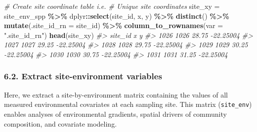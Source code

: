 \documentclass[
]{article}
\newenvironment{Shaded}{\begin{snugshade}}{\end{snugshade}}
\newcommand{\AttributeTok}[1]{\textcolor[rgb]{0.13,0.29,0.53}{#1}}
\newcommand{\CommentTok}[1]{\textcolor[rgb]{0.56,0.35,0.01}{\textit{#1}}}
\newcommand{\FunctionTok}[1]{\textcolor[rgb]{0.13,0.29,0.53}{\textbf{#1}}}
\newcommand{\NormalTok}[1]{#1}
\newcommand{\OtherTok}[1]{\textcolor[rgb]{0.56,0.35,0.01}{#1}}
\newcommand{\SpecialCharTok}[1]{\textcolor[rgb]{0.81,0.36,0.00}{\textbf{#1}}}
\newcommand{\StringTok}[1]{\textcolor[rgb]{0.31,0.60,0.02}{#1}}
\begin{document}
\begin{Shaded}
\begin{Highlighting}[]
\CommentTok{\# Create site coordinate table i.e. \# Unique site coordinates}
\NormalTok{site\_xy }\OtherTok{=}\NormalTok{ site\_env\_spp }\SpecialCharTok{\%\textgreater{}\%}
\NormalTok{  dplyr}\SpecialCharTok{::}\FunctionTok{select}\NormalTok{(site\_id, x, y) }\SpecialCharTok{\%\textgreater{}\%}
  \FunctionTok{distinct}\NormalTok{() }\SpecialCharTok{\%\textgreater{}\%}
  \FunctionTok{mutate}\NormalTok{(}\AttributeTok{.site\_id\_rn =}\NormalTok{ site\_id) }\SpecialCharTok{\%\textgreater{}\%}
  \FunctionTok{column\_to\_rownames}\NormalTok{(}\AttributeTok{var =} \StringTok{".site\_id\_rn"}\NormalTok{)}
\FunctionTok{head}\NormalTok{(site\_xy)}
\CommentTok{\#\textgreater{}      site\_id     x         y}
\CommentTok{\#\textgreater{} 1026    1026 28.75 {-}22.25004}
\CommentTok{\#\textgreater{} 1027    1027 29.25 {-}22.25004}
\CommentTok{\#\textgreater{} 1028    1028 29.75 {-}22.25004}
\CommentTok{\#\textgreater{} 1029    1029 30.25 {-}22.25004}
\CommentTok{\#\textgreater{} 1030    1030 30.75 {-}22.25004}
\CommentTok{\#\textgreater{} 1031    1031 31.25 {-}22.25004}
\end{Highlighting}
\end{Shaded}

\hypertarget{extract-site-environment-variables}{%
\subsubsection{\texorpdfstring{6.2. Extract \textbf{site-environment}
variables}{6.2. Extract site-environment variables}}\label{extract-site-environment-variables}}

Here, we extract a site-by-environment matrix containing the values of
all measured environmental covariates at each sampling site. This matrix
(\texttt{site\_env}) enables analyses of environmental gradients,
spatial drivers of community composition, and covariate modeling.
\end{document}
